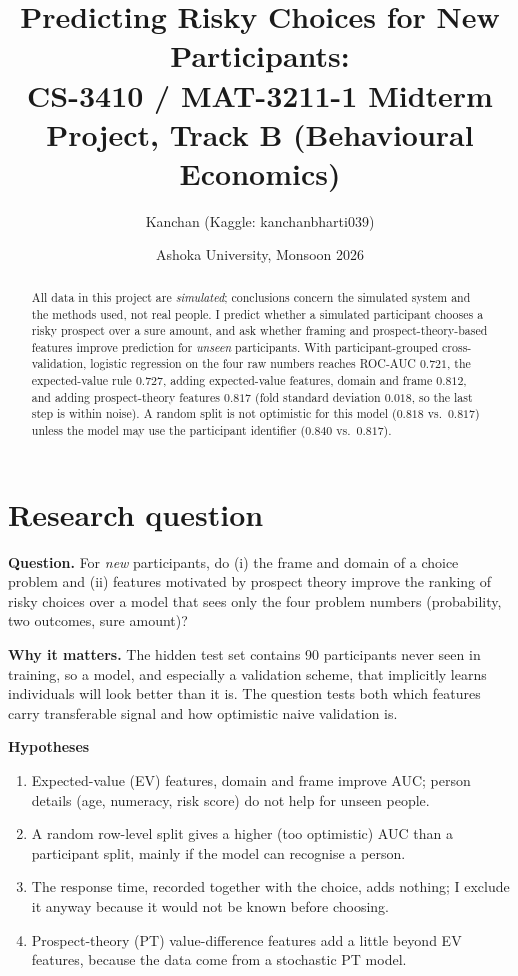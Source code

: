 \documentclass[11pt,a4paper]{article}
\title{Predicting Risky Choices for New Participants:\\
\large CS-3410 / MAT-3211-1 Midterm Project, Track B (Behavioural Economics)}
\author{Kanchan \quad (Kaggle: kanchanbharti039)}
\date{Ashoka University, Monsoon 2026}
\begin{document}
\maketitle

\begin{abstract}
\noindent All data in this project are \emph{simulated}; conclusions concern the simulated system and the methods used, not real people. I predict whether a simulated participant chooses a risky prospect over a sure amount, and ask whether framing and prospect-theory-based features improve prediction for \emph{unseen} participants. With participant-grouped cross-validation, logistic regression on the four raw numbers reaches ROC-AUC $0.721$, the expected-value rule $0.727$, adding expected-value features, domain and frame $0.812$, and adding prospect-theory features $0.817$ (fold standard deviation $0.018$, so the last step is within noise). A random split is not optimistic for this model ($0.818$ vs.\ $0.817$) unless the model may use the participant identifier ($0.840$ vs.\ $0.817$).
\end{abstract}

\section{Research question}
\textbf{Question.} For \emph{new} participants, do (i) the frame and domain of a choice problem and (ii) features motivated by prospect theory improve the ranking of risky choices over a model that sees only the four problem numbers (probability, two outcomes, sure amount)?

\textbf{Why it matters.} The hidden test set contains 90 participants never seen in training, so a model, and especially a validation scheme, that implicitly learns individuals will look better than it is. The question tests both which features carry transferable signal and how optimistic naive validation is.

\textbf{Hypotheses}
\begin{enumerate}[label=H\arabic*.]
\item Expected-value (EV) features, domain and frame improve AUC; person details (age, numeracy, risk score) do not help for unseen people.
\item A random row-level split gives a higher (too optimistic) AUC than a participant split, mainly if the model can recognise a person.
\item The response time, recorded together with the choice, adds nothing; I exclude it anyway because it would not be known before choosing.
\item Prospect-theory (PT) value-difference features add a little beyond EV features, because the data come from a stochastic PT model.
\end{enumerate}
\end{document}
